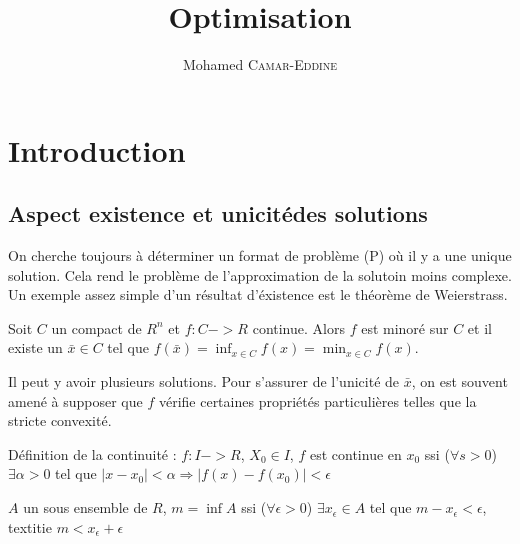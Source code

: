 \providecommand{\VarRectoVerso}{oneside}


%

\title{Optimisation}
\author{Mohamed \textsc{Camar-Eddine}}




\maketitle

\tableofcontents

\section{Introduction}


	\subsection{Aspect \og existence et unicité\fg des solutions}
	
	On cherche toujours à déterminer un format de problème (P) où il y a une unique solution. Cela rend le problème de l'approximation de la solutoin moins complexe. Un exemple assez simple d'un résultat d'éxistence est le théorème de Weierstrass.
	
	Soit $C$ un compact de $R^n$ et $f: C->R$ continue. Alors $f$ est minoré sur $C$ et il existe un $\bar{x} \in C$ tel que $f(\bar{x}) = \inf_{x \in C} f(x) = \min_{x \in C} f(x)$.
	
	Il peut y avoir plusieurs solutions. Pour s'assurer de l'unicité de $\bar{x}$, on est souvent amené à supposer que $f$ vérifie certaines propriétés particulières telles que la stricte convexité.
	
	Définition de la continuité :
	$f:I->R$, $X_0 \in I$, $f$ est continue en $x_0$ ssi ($ \forall s>0$) $\exists \alpha >0$ tel que $|x-x_0| < \alpha \Rightarrow |f(x)-f(x_0)| < \epsilon$
	
	$A$ un sous ensemble de $R$, $m = \inf A$ ssi ($\forall \epsilon>0$) $\exists x_\epsilon \in A$ tel que $m - x_\epsilon < \epsilon$, textit{ie} $m < x_\epsilon + \epsilon$
	
